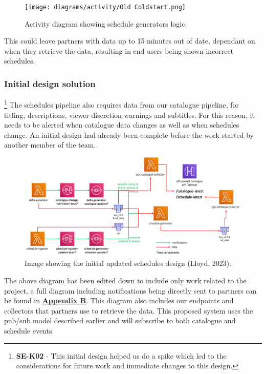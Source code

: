   \begin{figure}[H]
    \centering
    \texttt{[image: diagrams/activity/Old Coldstart.png]}
    \caption{Activity diagram showing schedule generators logic.}
    \label{fig:oldColdstart}
  \end{figure}

  This could leave partners with data up to 15 minutes out of date, dependant on when they retrieve the data, resulting in end users being shown incorrect
  schedules. 
  
  \newpage
    \subsubsection{Initial design solution}
    \footnote{\textbf{SE-K02} - This initial design helped us do a spike which led to the considerations for future work and immediate changes to this design.}
    The schedules pipeline also requires data from our catalogue pipeline, for titling, descriptions, viewer discretion warnings and subtitles. For this 
    reason, it needs to be alerted when catalogue data changes as well as when schedules change. An initial design had already been complete before the work 
    started by another member of the team.

    \begin{figure}[H]
      \centering
      \includegraphics[width=12cm]{assets/initialDesign/architecture.png}
      \caption{Image showing the initial updated schedules design (Lloyd, 2023).}
      \label{fig:initialDesign}
    \end{figure}

    The above diagram has been edited down to include only work related to the project, a full diagram including notifications being directly sent to partners can 
    be found in \hyperref[sec:AppendixB]{\textbf{Appendix B}}. This diagram also includes our endpoints and collectors that partners use to 
    retrieve the data. This proposed system uses the pub/sub model described earlier and will subscribe to both catalogue and schedule events.

